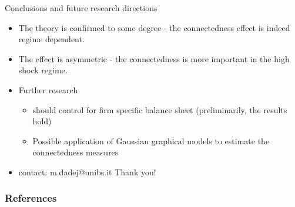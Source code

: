 \documentclass{beamer}
\begin{document}
\begin{frame}{Conclusions and future research directions}
\begin{itemize}
  \item<1-> The theory is confirmed to some degree - the connectedness effect is indeed regime dependent.
  \item<2-> The effect is asymmetric - the connectedness is more important in the high shock regime.
  \item<3-> Further research 
  \begin{itemize}
    \item<4-> should control for firm specific balance sheet (preliminarily, the results hold)
    \item<5-> Possible application of Gaussian graphical models to estimate the connectedness measures
  \end{itemize}
  \item<6-> contact: m.dadej@unibs.it Thank you!
\end{itemize}



\end{frame}
\begin{frame}[allowframebreaks]
\frametitle{References}
  \printbibliography
\end{frame}
\end{document}
